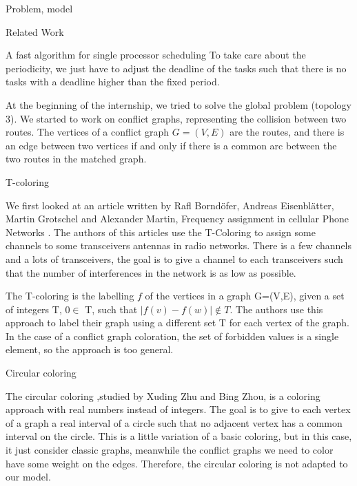 \documentclass[a4paper,10pt]{report}
\begin{document}
\begin{chapter}{Problem, model}
\begin{section}{Related Work}
\begin{subsection}{A fast algorithm for single processor scheduling}
To take care about the periodicity, we just have to adjust the deadline of the tasks such that there is no tasks with a deadline 
higher than the fixed period.

\end{subsection}

 At the beginning of the internship, we tried to solve the global problem (topology 3). We started to work on conflict graphs, representing
 the collision between two routes. The vertices of a conflict graph $G = (V,E)$ are the routes, and there is an edge between two vertices
 if and only if there is a common arc between the two routes in the matched graph.
 
\begin{subsection}{T-coloring}


 We first looked at an article written by Rafl Borndöfer, Andreas Eisenblätter, Martin Grotschel and Alexander Martin, Frequency assignment
 in cellular Phone Networks \cite{borndorfer1998frequency}. The authors of this articles use the T-Coloring to assign some channels to some 
 transceivers antennas in radio networks. There is a few channels and a lots of transceivers, the goal is to give a channel to each transceivers
 such that the number of interferences in the network is as low as possible.
 
 The T-coloring is the labelling $f$ of the vertices in a graph G=(V,E), given a set of integers T, $0 \in$ T, such that 
 $|f(v) - f(w)| \notin T$.
 The authors use this approach to label their graph using a different set T for each vertex of the graph.
 In the case of a conflict graph coloration, the set of forbidden values is a single element, so the approach is too general.

\end{subsection}
\begin{subsection}{Circular coloring}

 The circular coloring ,studied by Xuding Zhu\cite{zhu2006recent}\cite{zhu2001circular} and Bing Zhou\cite{zhou2013multiple},
 is a coloring approach with real numbers instead of integers. The goal is to give to each vertex of a graph 
 a real interval of a circle such that no adjacent vertex has a common interval on the circle. This is a little variation of a
 basic coloring, but in this case, it just consider classic graphs, meanwhile the conflict graphs we need to color have some weight
 on the edges. Therefore, the circular coloring is not adapted to our model.

\end{subsection}


\end{section}
\end{chapter}
\end{document}
